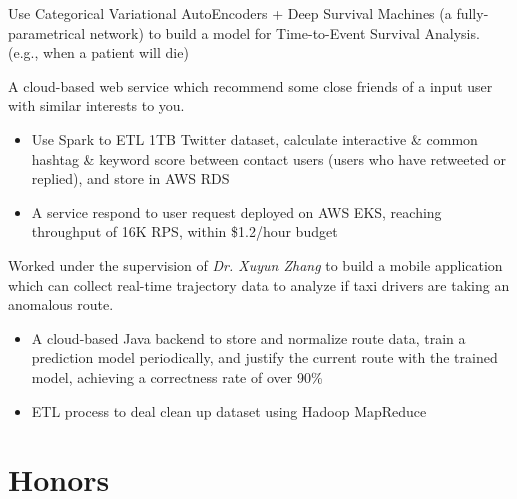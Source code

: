 \documentclass{resume}
\begin{document}
\begin{flushleft}
Use Categorical Variational AutoEncoders + Deep Survival Machines (a fully-parametrical network) to build a model for Time-to-Event Survival Analysis. (e.g., when a patient will die)

A cloud-based web service which recommend some close friends of a input user with similar interests to you.
\begin{itemize}
    \item Use Spark to ETL 1TB Twitter dataset, calculate interactive \& common hashtag \& keyword score between contact users (users who have retweeted or replied), and store in AWS RDS
    \item A service respond to user request deployed on AWS EKS, reaching throughput of 16K RPS, within \$1.2/hour budget
\end{itemize}


Worked under the supervision of \textit{Dr. Xuyun Zhang} to build a mobile application which can collect real-time trajectory data to analyze if taxi drivers are taking an anomalous route.
\begin{itemize}
    \item A cloud-based Java backend to store and normalize route data, train a prediction model periodically, \linebreak and justify the current route with the trained model, achieving a correctness rate of over 90\%
    \item ETL process to deal clean up dataset using Hadoop MapReduce
\end{itemize}
\end{flushleft}

\section{Honors}
\end{document}

